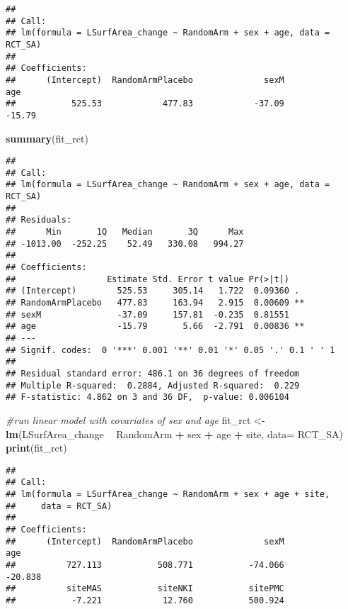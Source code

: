 \documentclass[]{article}
\newenvironment{Shaded}{\begin{snugshade}}{\end{snugshade}}
\newcommand{\KeywordTok}[1]{\textcolor[rgb]{0.13,0.29,0.53}{\textbf{#1}}}
\newcommand{\DataTypeTok}[1]{\textcolor[rgb]{0.13,0.29,0.53}{#1}}
\newcommand{\StringTok}[1]{\textcolor[rgb]{0.31,0.60,0.02}{#1}}
\newcommand{\CommentTok}[1]{\textcolor[rgb]{0.56,0.35,0.01}{\textit{#1}}}
\newcommand{\OperatorTok}[1]{\textcolor[rgb]{0.81,0.36,0.00}{\textbf{#1}}}
\newcommand{\NormalTok}[1]{#1}
\theoremstyle{definition}
\theoremstyle{definition}
\theoremstyle{definition}
\theoremstyle{remark}
\begin{document}
\begin{verbatim}
## 
## Call:
## lm(formula = LSurfArea_change ~ RandomArm + sex + age, data = RCT_SA)
## 
## Coefficients:
##      (Intercept)  RandomArmPlacebo              sexM               age  
##           525.53            477.83            -37.09            -15.79
\end{verbatim}

\begin{Shaded}
\begin{Highlighting}[]
  \KeywordTok{summary}\NormalTok{(fit_rct)}
\end{Highlighting}
\end{Shaded}

\begin{verbatim}
## 
## Call:
## lm(formula = LSurfArea_change ~ RandomArm + sex + age, data = RCT_SA)
## 
## Residuals:
##      Min       1Q   Median       3Q      Max 
## -1013.00  -252.25    52.49   330.08   994.27 
## 
## Coefficients:
##                  Estimate Std. Error t value Pr(>|t|)   
## (Intercept)        525.53     305.14   1.722  0.09360 . 
## RandomArmPlacebo   477.83     163.94   2.915  0.00609 **
## sexM               -37.09     157.81  -0.235  0.81551   
## age                -15.79       5.66  -2.791  0.00836 **
## ---
## Signif. codes:  0 '***' 0.001 '**' 0.01 '*' 0.05 '.' 0.1 ' ' 1
## 
## Residual standard error: 486.1 on 36 degrees of freedom
## Multiple R-squared:  0.2884, Adjusted R-squared:  0.229 
## F-statistic: 4.862 on 3 and 36 DF,  p-value: 0.006104
\end{verbatim}

\begin{Shaded}
\begin{Highlighting}[]
\CommentTok{#run linear model with covariates of sex and age}
\NormalTok{  fit_rct <-}\StringTok{ }\KeywordTok{lm}\NormalTok{(LSurfArea_change }\OperatorTok{~}\StringTok{ }\NormalTok{RandomArm }\OperatorTok{+}\StringTok{ }\NormalTok{sex }\OperatorTok{+}\StringTok{ }\NormalTok{age }\OperatorTok{+}\StringTok{ }\NormalTok{site, }\DataTypeTok{data=}\NormalTok{ RCT_SA)}
  \KeywordTok{print}\NormalTok{(fit_rct)}
\end{Highlighting}
\end{Shaded}

\begin{verbatim}
## 
## Call:
## lm(formula = LSurfArea_change ~ RandomArm + sex + age + site, 
##     data = RCT_SA)
## 
## Coefficients:
##      (Intercept)  RandomArmPlacebo              sexM               age  
##          727.113           508.771           -74.066           -20.838  
##          siteMAS           siteNKI           sitePMC  
##           -7.221            12.760           500.924
\end{verbatim}
\end{document}

